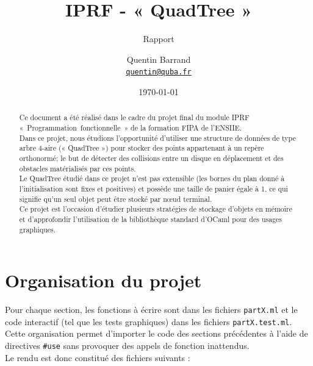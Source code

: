 \documentclass[11pt]{scrartcl}
\newcommand{\filename}[1]{\texttt{\textcolor{darkbrown}{#1}}}
\begin{document}
\title{\textbf{IPRF - « QuadTree »}}
\subtitle{Rapport}

\author{Quentin Barrand\\
		\href{mailto:quentin@quba.fr}{\texttt{quentin@quba.fr}}}
		
\date{\today}

\maketitle

\begin{abstract}
Ce document a été réalisé dans le cadre du projet final du module IPRF \mbox{« Programmation fonctionnelle »} de la formation FIPA de l'ENSIIE.\\
Dans ce projet, nous étudions l'opportunité d'utiliser une structure de données de type arbre 4-aire (« QuadTree ») pour stocker des points appartenant à un repère orthonormé; le but de détecter des collisions entre un disque en déplacement et des obstacles matérialisés par ces points.\\
Le QuadTree étudié dans ce projet n'est pas extensible (les bornes du plan donné à l'initialisation sont fixes et positives) et possède une taille de panier égale à 1, ce qui signifie qu'un seul objet peut être stocké par nœud terminal.\\
Ce projet est l'occasion d'étudier plusieurs stratégies de stockage d'objets en mémoire et d'approfondir l'utilisation de la bibliothèque standard d'OCaml pour des usages graphiques.
\end{abstract}

\break

\section*{Organisation du projet}
Pour chaque section, les fonctions à écrire sont dans les fichiers \filename{partX.ml} et le code interactif (tel que les tests graphiques) dans les fichiers \filename{partX.test.ml}. Cette organisation permet d'importer le code des sections précédentes à l'aide de directives \texttt{#use} sans provoquer des appels de fonction inattendus.
\\
Le rendu est donc constitué des fichiers suivants :
\end{document}
